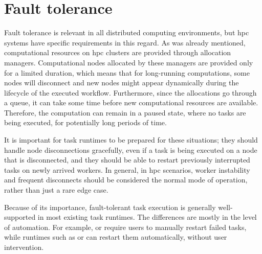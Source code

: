 \section{Fault tolerance}
Fault tolerance is relevant in all distributed computing environments, but
\gls{hpc} systems have specific requirements in this regard. As was already
mentioned, computational resources on \gls{hpc} clusters are provided through
allocation managers. Computational nodes allocated by these managers are provided only for a limited
duration, which means that for long-running computations, some nodes will disconnect and new nodes
might appear dynamically during the lifecycle of the executed workflow. Furthermore, since the
allocations go through a queue, it can take some time before new computational resources are
available. Therefore, the computation can remain in a paused state, where no tasks are being
executed, for potentially long periods of time.

It is important for task runtimes to be prepared for these situations; they should handle node
disconnections gracefully, even if a task is being executed on a node that is disconnected, and
they should be able to restart previously interrupted tasks on newly arrived workers. In general,
in \gls{hpc} scenarios, worker instability and frequent disconnects should be
considered the normal mode of operation, rather than just a rare edge case.

Because of its importance, fault-tolerant task execution is generally well-supported in most
existing task runtimes. The differences are mostly in the level of automation. For example,
\fireworks{} or \merlin{} require users to manually restart failed tasks, while runtimes such as
\dask{} or \balsam{} can restart them automatically, without user intervention.

